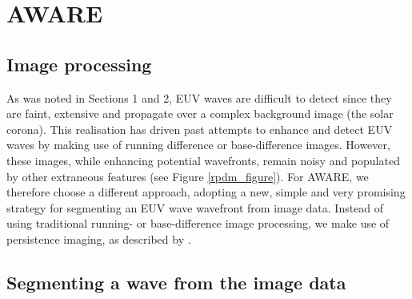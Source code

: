 \section{AWARE}\label{sec:aware}

\subsection{Image processing}
\label{img_proc}

As was noted in Sections 1 and 2, EUV waves are difficult to detect
since they are faint, extensive and propagate over a complex
background image (the solar corona). This realisation has driven past
attempts to enhance and detect EUV waves by making use of running
difference or base-difference images. However, these images, while
enhancing potential wavefronts, remain noisy and populated by other
extraneous features (see Figure \ref{rpdm_figure}). For AWARE, we
therefore choose a different approach, adopting a new, simple and very
promising strategy for segmenting an EUV wave wavefront from image
data. Instead of using traditional running- or base-difference image
processing, we make use of persistence imaging, as described by
\citet{2014AAS...22421838T}.

\subsection{Segmenting a wave from the image data}\label{sec:aware:segment}

